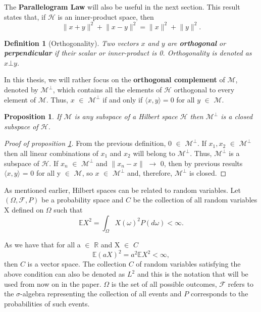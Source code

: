 \documentclass{article}
\newtheorem{defn}{Definition}
\newtheorem{prop}{Proposition}
\begin{document}
The \textbf{Parallelogram Law} will also be useful in the next section. This result states that, if $\mathscr{H}$ is an inner-product space, then
\[
\lVert x + y\rVert^2 + \lVert x - y\rVert^2 = \lVert x \rVert^2 + \lVert y\rVert^2.
\]

\begin{defn}[Orthogonality]
Two vectors $x$ and $y$ are \textbf{orthogonal} or \textbf{perpendicular} if their scalar or inner-product is 0. Orthogonality is denoted as $x \bot y$. 
\end{defn}

In this thesis, we will rather focus on the \textbf{orthogonal complement} of $\mathscr{M}$, denoted by $\mathscr{M^\bot}$, which contains all the elements of  $\mathscr{H}$ orthogonal to every element of $\mathscr{M}$. Thus, $x$ $\in$ $\mathscr{M^\bot}$ if and only if $\langle x,y \rangle = 0$ for all $y$ $\in$ $\mathscr{M}$. \newline

\begin{prop}\label{prop:coc}
If $\mathscr{M}$ is any subspace of a Hilbert space $\mathscr{H}$ then $\mathscr{M^\bot}$ is a closed subspace of $\mathscr{H}$.
\end{prop}

\begin{proof}[Proof of proposition \ref{prop:coc}]
From the previous definition, 0 $\in$ $\mathscr{M^\bot}$. If $x_1, x_2$ $\in$ $\mathscr{M^\bot}$ then all linear combinations of ${x_1}$ and ${x_2}$ will belong to $\mathscr{M^\bot}$. Thus, $\mathscr{M^\bot}$  is a subspace of $\mathscr{H}$. If $x_n$ $\in$ $\mathscr{M^\bot}$ and $\lVert x_n - x \rVert$ $\rightarrow$ 0, then by previous results $\langle x,y \rangle$ = 0 for all y $\in$ $\mathscr{M}$, so $x$ $\in$ $\mathscr{M^\bot}$ and, therefore, $\mathscr{M^\bot}$ is closed. \newline
\end{proof}

As mentioned earlier, Hilbert spaces can be related to random variables. Let $(\Omega, \mathscr{F}, P)$ be a probability space and $C$ be the collection of all random variables X defined on $\Omega$ such that 
\[ \mathbb EX^2 = \int_\Omega X(\omega )^2P(d\omega) < \infty.\] 

As we have that for all a $\in$ $\mathbb{R}$ and X $\in$ $C$ \[ \mathbb E(aX)^2 = a^2 \mathbb EX^2 < \infty,\]
then $C$ is a vector space. The collection $C$ of random variables satisfying the above condition can also be denoted as $L^2$ and this is the notation that will be used from now on in the paper. $\Omega$ is the set of all possible outcomes, $\mathscr{F}$ refers to the $\sigma$-algebra representing the collection of all events and $P$ corresponds to the probabilities of such events. \newline
\end{document}
